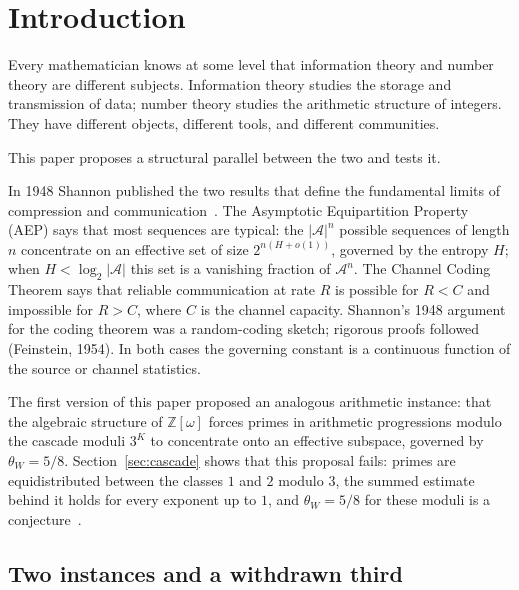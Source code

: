 \documentclass[12pt]{amsart}
\theoremstyle{plain}
\theoremstyle{definition}
\theoremstyle{remark}
\newcommand{\Z}{\mathbb{Z}}
\newcommand{\thetaW}{\theta_W}
\newcommand{\Zomega}{\Z[\omega]}
\begin{document}
\tableofcontents

\section{Introduction}

Every mathematician knows at some level that information theory and number theory
are different subjects. Information theory studies the storage and transmission of
data; number theory studies the arithmetic structure of integers. They have
different objects, different tools, and different communities.

This paper proposes a structural parallel between the two and tests it.

In 1948 Shannon published the two results that define the fundamental limits of
compression and communication~\cite{Shannon1948}. The Asymptotic Equipartition
Property (AEP) says that most sequences are typical: the $|\mathcal{A}|^n$
possible sequences of length $n$ concentrate on an effective set of size
$2^{n(H+o(1))}$, governed by the entropy $H$; when $H < \log_2|\mathcal{A}|$ this
set is a vanishing fraction of $\mathcal{A}^n$. The Channel Coding Theorem says
that reliable communication at rate $R$ is possible for $R < C$ and impossible
for $R > C$, where $C$ is the channel capacity. Shannon's 1948 argument for the
coding theorem was a random-coding sketch; rigorous proofs followed (Feinstein,
1954). In both cases the governing constant is a continuous function of the
source or channel statistics.

The first version of this paper proposed an analogous arithmetic instance: that
the algebraic structure of $\Zomega$ forces primes in arithmetic progressions
modulo the cascade moduli $3^K$ to concentrate onto an effective subspace,
governed by $\thetaW = 5/8$. Section~\ref{sec:cascade} shows that this proposal
fails: primes are equidistributed between the classes $1$ and $2$ modulo $3$, the
summed estimate behind it holds for every exponent up to $1$, and $\thetaW = 5/8$
for these moduli is a conjecture~\cite{WakilEisenstein}.

\subsection{Two instances and a withdrawn third}
\end{document}
